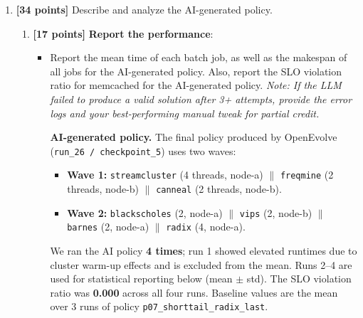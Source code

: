 \begin{enumerate}
\begin{enumerate}
\begin{itemize}
\textbf{vs \texttt{p02}} (Table~\ref{tabmakespancompare}): mean batch window
shortens by $\approx 121$\,s ($\approx 24\%$) relative to the \texttt{p02}
mean, with comparable SLO behaviour.

\textbf{vs \texttt{p06}} (single exploratory screening run): \texttt{p06} also
passes gates at 415\,s but \texttt{p07} delivers lower mean makespan under three
repetitions and is therefore the reported design.

\textbf{Second-best reference — \texttt{p02\_balanced\_waves}.}
It is the original fully evaluated baseline with transparent wave structure and
clear identification of the node-b idle gap that motivated \texttt{p06} and
\texttt{p07}.

\textbf{vs \texttt{p01}} remains unchanged from the screening discussion: valid
but substantially slower.

    
    \end{itemize}
    \end{enumerate}
    \item \textbf{[34 points]} Describe and analyze the AI-generated policy.

    \begin{enumerate}
        \item \textbf{[17 points]} \textbf{Report the performance}:

        \begin{itemize}
            \item Report the mean time of each batch job, as well as the makespan of all jobs for the AI-generated policy. Also, report the SLO violation ratio for memcached for the AI-generated policy. \textit{Note: If the LLM failed to produce a valid solution after 3+ attempts, provide the error logs and your best-performing manual tweak for partial credit.}

        \noindent\textbf{AI-generated policy.}
        The final policy produced by OpenEvolve (\texttt{run\_26 / checkpoint\_5}) uses two waves:
        \begin{itemize}
          \item \textbf{Wave 1:} \texttt{streamcluster} (4 threads, node-a) $\parallel$ \texttt{freqmine} (2 threads, node-b) $\parallel$ \texttt{canneal} (2 threads, node-b).
          \item \textbf{Wave 2:} \texttt{blackscholes} (2, node-a) $\parallel$ \texttt{vips} (2, node-b) $\parallel$ \texttt{barnes} (2, node-a) $\parallel$ \texttt{radix} (4, node-a).
        \end{itemize}
        We ran the AI policy \textbf{4 times}; run 1 showed elevated runtimes due to cluster warm-up effects and is excluded from the mean. Runs 2--4 are used for statistical reporting below (mean $\pm$ std). The SLO violation ratio was \textbf{0.000} across all four runs. Baseline values are the mean over 3 runs of policy \texttt{p07\_shorttail\_radix\_last}.


\end{itemize}
\end{enumerate}
\end{enumerate}
